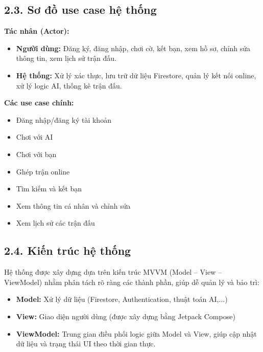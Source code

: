 \documentclass[a4paper,12pt]{article}
\begin{document}
\subsection*{2.3. Sơ đồ use case hệ thống} %

\justify
\noindent \textbf{Tác nhân (Actor):}
\begin{itemize}[label=·]
    \item \textbf{Người dùng:} Đăng ký, đăng nhập, chơi cờ, kết bạn, xem hồ sơ, chỉnh sửa thông tin, xem lịch sử trận đấu.
    \item \textbf{Hệ thống:} Xử lý xác thực, lưu trữ dữ liệu Firestore, quản lý kết nối online, xử lý logic AI, thống kê trận đấu.
\end{itemize}

\noindent \textbf{Các use case chính:}
\begin{itemize}[label=·]
    \item Đăng nhập/đăng ký tài khoản
    \item Chơi với AI
    \item Chơi với bạn
    \item Ghép trận online
    \item Tìm kiếm và kết bạn
    \item Xem thông tin cá nhân và chỉnh sửa
    \item Xem lịch sử các trận đấu
\end{itemize}

\subsection*{2.4. Kiến trúc hệ thống} %

\justify
\noindent Hệ thống được xây dựng dựa trên kiến trúc MVVM (Model – View – ViewModel) nhằm phân tách rõ ràng các thành phần, giúp dễ quản lý và bảo trì:
\begin{itemize}[label=·]
    \item \textbf{Model:} Xử lý dữ liệu (Firestore, Authentication, thuật toán AI,...)
    \item \textbf{View:} Giao diện người dùng (được xây dựng bằng Jetpack Compose)
    \item \textbf{ViewModel:} Trung gian điều phối logic giữa Model và View, giúp cập nhật dữ liệu và trạng thái UI theo thời gian thực.
\end{itemize}
\end{document}
